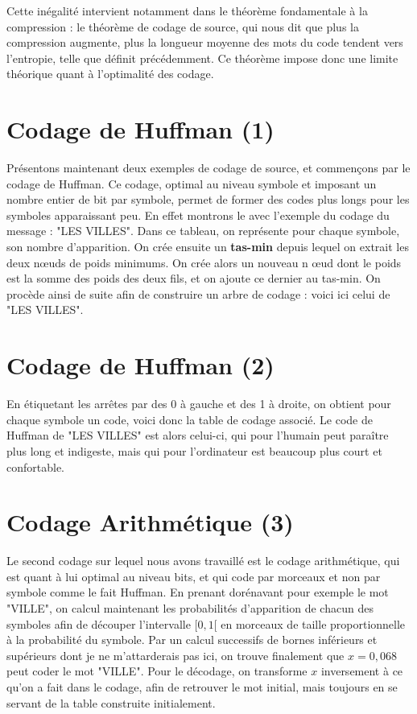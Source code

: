 \documentclass{article}
\begin{document}
Cette inégalité intervient notamment dans le théorème fondamentale à la compression : le théorème de codage de source, qui nous dit que 
plus la compression augmente, plus la longueur moyenne des mots du code tendent vers l'entropie, telle que définit précédemment.
Ce théorème impose donc une limite théorique quant à l'optimalité des codage.

\section{Codage de Huffman (1)}

Présentons maintenant deux exemples de codage de source, et commençons par le codage de Huffman.
Ce codage, optimal au niveau symbole et imposant un nombre entier de bit par symbole, permet de 
former des codes plus longs pour les symboles apparaissant peu. En effet montrons le avec l'exemple
du codage du message : "LES VILLES". Dans ce tableau, on représente pour chaque symbole, son nombre
d'apparition. On crée ensuite un \textbf{tas-min} depuis lequel on extrait les deux n\oe uds de poids minimums.
On crée alors un nouveau n \oe ud dont le poids est la somme des poids des deux fils, et on ajoute ce dernier
au tas-min. On procède ainsi de suite afin de construire un arbre de codage : voici ici celui de "LES VILLES". 

\section{Codage de Huffman (2)}

En étiquetant les arrêtes par des 0 à gauche et des 1 à droite, on obtient pour chaque symbole un code, voici 
donc la table de codage associé. Le code de Huffman de "LES VILLES" est alors celui-ci, qui pour l'humain peut
paraître plus long et indigeste, mais qui pour l'ordinateur est beaucoup plus court et confortable.

\section{Codage Arithmétique (3)}

Le second codage sur lequel nous avons travaillé est le codage arithmétique, qui est quant à lui optimal au
niveau bits, et qui code par morceaux et non par symbole comme le fait Huffman. En prenant dorénavant pour
exemple le mot "VILLE", on calcul maintenant les probabilités d'apparition de chacun des symboles afin de 
découper l'intervalle $[0, 1[$ en morceaux de taille proportionnelle à la probabilité du symbole. Par un calcul
successifs de bornes inférieurs et supérieurs dont je ne m'attarderais pas ici, on trouve finalement que $x = 0,068$
peut coder le mot "VILLE". Pour le décodage, on transforme $x$ inversement à ce qu'on a fait dans le codage, afin
de retrouver le mot initial, mais toujours en se servant de la table construite initialement.
\end{document}
